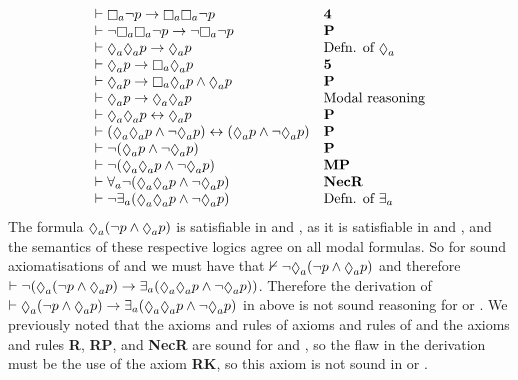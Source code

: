 $$
\begin{array}{ll}
    \proves \necessaryA \lnot \atomP \implies \necessaryA \necessaryA \lnot \atomP & {\bf 4}\\
    \proves \lnot \necessaryA \necessaryA \lnot \atomP \implies \lnot \necessaryA \lnot \atomP & {\bf P}\\
    \proves \possibleA \possibleA \atomP \implies \possibleA \atomP & \text{Defn. of $\possibleA$}\\
    \proves \possibleA \atomP \implies \necessaryA \possibleA \atomP & {\bf 5}\\
    \proves \possibleA \atomP \implies \necessaryA \possibleA \atomP \land \possibleA \atomP & {\bf P}\\
    \proves \possibleA \atomP \implies \possibleA \possibleA \atomP & \text{Modal reasoning}\\
    \proves \possibleA \possibleA \atomP \iff \possibleA \atomP & {\bf P}\\
    \proves (\possibleA \possibleA \atomP \land \lnot \possibleA \atomP) \iff (\possibleA \atomP \land \lnot \possibleA \atomP) & {\bf P}\\
    \proves \lnot (\possibleA \atomP \land \lnot \possibleA \atomP) & {\bf P}\\
    \proves \lnot (\possibleA \possibleA \atomP \land \lnot \possibleA \atomP) & {\bf MP}\\
    \proves \allrefsA \lnot (\possibleA \possibleA \atomP \land \lnot \possibleA \atomP) & {\bf NecR}\\
    \proves \lnot \somerefsA (\possibleA \possibleA \atomP \land \lnot \possibleA \atomP) & \text{Defn. of $\somerefsA$}
\end{array}
$$
The formula $\possibleA (\lnot \atomP \land \possibleA \atomP)$ is satisfiable in \logicRmlKFF{} and \logicRmlKD{}, as it is satisfiable in \logicKFF{} and \logicKD{}, and the semantics of these respective logics agree on all modal formulas.
So for sound axiomatisations of \logicRmlKFF{} and \logicRmlKD{} we must have that $\nproves \lnot \possibleA (\lnot \atomP \land \possibleA \atomP)$ and therefore $\proves \lnot (\possibleA (\lnot \atomP \land \possibleA \atomP) \implies \somerefsA (\possibleA \possibleA \atomP \land \lnot \possibleA \atomP))$.
Therefore the derivation of $\proves \possibleA (\lnot \atomP \land \possibleA \atomP) \implies \somerefsA (\possibleA \possibleA \atomP \land \lnot \possibleA \atomP)$ in \axiomRmlK{} above is not sound reasoning for \logicRmlKFF{} or \logicRmlKD{}.
We previously noted that the axioms and rules of axioms and rules of \axiomK{} and the axioms and rules {\bf R}, {\bf RP}, and {\bf NecR} are sound for \logicRmlKFF{} and \logicRmlKD{}, so the flaw in the derivation must be the use of the axiom {\bf RK}, so this axiom is not sound in \logicRmlKFF{} or \logicRmlKD{}.

